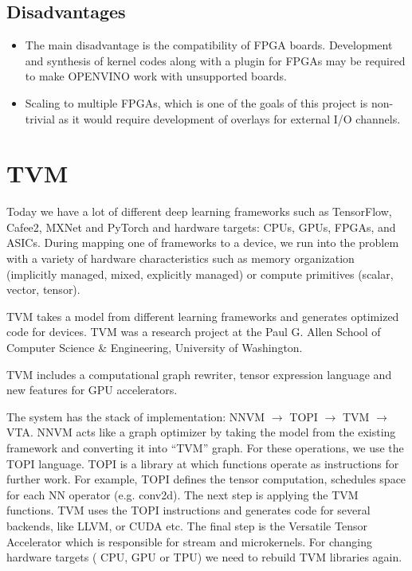 \documentclass[titlepage]{report}
\begin{document}
 \subsection{Disadvantages}
 \begin{itemize}
 \item The main disadvantage is the compatibility of FPGA boards. Development and synthesis of kernel codes along with a plugin for FPGAs may be required to make OPENVINO work with unsupported boards. 
 \item Scaling to multiple FPGAs, which is one of the goals of this project is non-trivial as it would require development of overlays for external I/O channels. 
 \end{itemize}
\section{TVM}

Today we have a lot of different deep learning frameworks such as TensorFlow, Cafee2, MXNet and PyTorch and hardware targets: CPUs, GPUs, FPGAs, and ASICs. During mapping one of frameworks to a device, we run into the problem with a variety of hardware characteristics such as memory organization (implicitly managed, mixed, explicitly managed) or compute primitives (scalar, vector, tensor).

TVM takes a model from different learning frameworks and generates optimized code for devices. TVM was a research project at the Paul G. Allen School of Computer Science & Engineering, University of Washington.

TVM includes a computational graph rewriter, tensor expression language and new features for GPU accelerators. 

The system has the stack of implementation: NNVM $\to$ TOPI $\to$ TVM $\to$ VTA. NNVM acts like a graph optimizer by taking the model from the existing framework and converting it into “TVM” graph. For these operations, we use the TOPI language. TOPI is a library at which functions operate as instructions for further work. For example, TOPI defines the tensor computation, schedules space for each NN operator (e.g. conv2d). The next step is applying the TVM functions. TVM uses the TOPI instructions and generates code for several backends, like LLVM, or CUDA etc. The final step is the Versatile Tensor Accelerator which is responsible for stream and microkernels.    
For changing hardware targets ( CPU, GPU or TPU) we need to rebuild TVM libraries again.  
 
\end{document}

